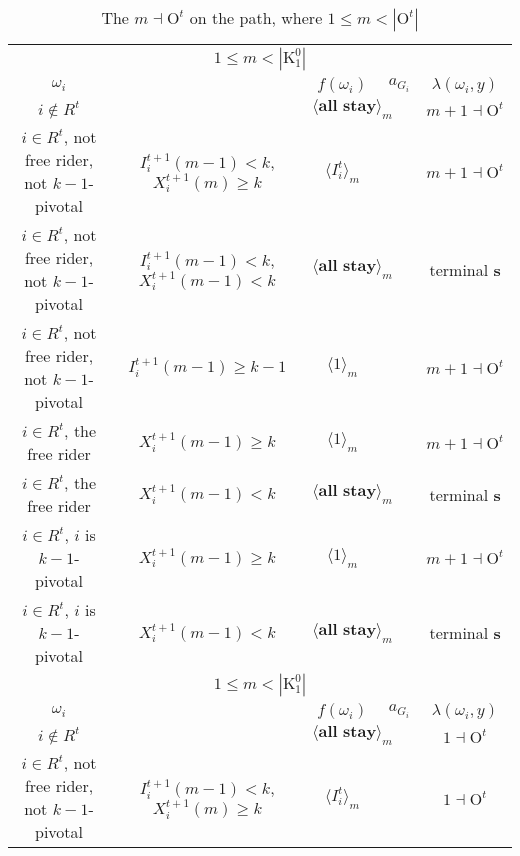 \documentclass[12pt,letter]{article}
\newcommand{\Kappa}{\mathrm{K}}
\newcommand{\Omicron}{\mathrm{O}}
\theoremstyle{definition}
\theoremstyle{remark}
\theoremstyle{claim}
\begin{document}
\begin{landscape}
\begin{table}[!htbp]
\caption{The $m\dashv\Omicron^t$ on the path, where $1\leq m<|\Omicron^t|$}
\begin{center}
\begin{tabular}{c c | c | c | c}
\multicolumn{5}{c}{$1\leq m < |\Kappa^0_1|$}\\
$\omega_i$ 	 & 	   &	$f(\omega_i)$  &	$a_{G_i}$ & $\lambda(\omega_i,y)$ \\
\hline
\hline
$i\notin R^t$  	& 								& $\langle \textbf{all stay} \rangle_m$		&  			& $m+1\dashv \Omicron^t$ \\
$i\in R^t$, not free rider, not $k-1$-pivotal	  	& $I^{t+1}_i(m-1)<k$, $X^{t+1}_i(m)\geq k$		    & $\langle I^t_i \rangle_m$ 		&    			& $m+1\dashv \Omicron^t$ \\
$i\in R^t$, not free rider, not $k-1$-pivotal		 	&  $I^{t+1}_i(m-1)< k$, $X^{t+1}_i(m-1)<k$			&  $\langle \textbf{all stay} \rangle_m$	& 									  & terminal \textbf{s} \\
$i\in R^t$, not free rider, not $k-1$-pivotal	 	&  $I^{t+1}_i(m-1)\geq k-1$			& $\langle 1 \rangle_m$ 	& 									  & $m+1\dashv \Omicron^t$ \\
$i\in R^t$, the free rider  	&  $X^{t+1}_i(m-1)\geq k$ & $\langle 1 \rangle_m$ 		& 				  & $m+1\dashv \Omicron^t$ \\
$i\in R^t$, the free rider  	&  		$X^{t+1}_i(m-1)<k$					&  $\langle \textbf{all stay} \rangle_m$		& 										  & terminal \textbf{s} \\
$i\in R^t$, $i$ is $k-1$-pivotal  	&  $X^{t+1}_i(m-1)\geq k$ & $\langle 1 \rangle_m$ 	& 											 & $m+1\dashv \Omicron^t$ \\
$i\in R^t$, $i$ is $k-1$-pivotal  	&  	$X^{t+1}_i(m-1)<k$		&  $\langle \textbf{all stay} \rangle_m$	& 											 & terminal \textbf{s} \\
\hline
\multicolumn{5}{c}{$1\leq m < |\Kappa^0_1|$}\\
$\omega_i$ 	 & 	   &	$f(\omega_i)$  &	$a_{G_i}$ & $\lambda(\omega_i,y)$ \\
\hline
\hline
$i\notin R^t$  	& 								& $\langle \textbf{all stay} \rangle_m$		&  			& $1\dashv \Omicron^t$ \\
$i\in R^t$, not free rider, not $k-1$-pivotal	  	& $I^{t+1}_i(m-1)<k$, $X^{t+1}_i(m)\geq k$		    & $\langle I^t_i \rangle_m$ 		&    			& $1\dashv \Omicron^t$ \\

\end{tabular}
\end{center}
\end{table}
\end{landscape}
\end{document}
